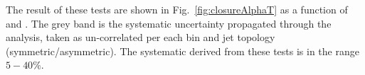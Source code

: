 The result of these tests are shown in Fig.~\ref{fig:closureAlphaT} as a function of \scalht and \njet. 
The grey band is the systematic uncertainty propagated through the analysis, 
taken as un-correlated per each \scalht bin and jet topology
(symmetric/asymmetric). The systematic derived from these tests is
in the range $5-40\%$.


\begin{figure}[h!]
  \begin{center}
    ~~
    \\
    ~~


\end{center}
\end{figure}
